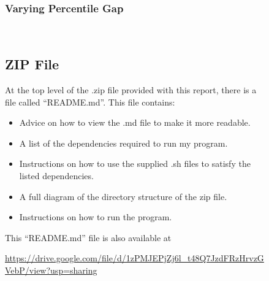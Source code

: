 \begin{figure}[p]
    \subsubsection{Varying Percentile Gap} \label{varyPerc}
    {\centering
    \\}
    
    \subsection{ZIP File}
    At the top level of the .zip file provided with this report, there is a file called ``README.md''. This file contains:
    \begin{itemize}
        \item Advice on how to view the .md file to make it more readable.
        \item A list of the dependencies required to run my program.
        \item Instructions on how to use the supplied .sh files to satisfy the listed dependencies.
        \item A full diagram of the directory structure of the zip file.
        \item Instructions on how to run the program.
    \end{itemize}
    This ``README.md'' file is also available at
    \begin{center}
        \url{https://drive.google.com/file/d/1zPMJEPjZj6l_t48Q7JzdFRzHrvzGVebP/view?usp=sharing}
    \end{center}
    
\end{figure}

